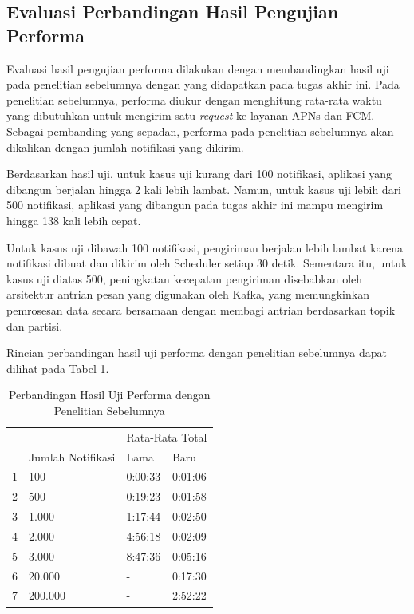 \subsection{Evaluasi Perbandingan Hasil Pengujian Performa}
\par Evaluasi hasil pengujian performa dilakukan dengan membandingkan hasil uji pada penelitian sebelumnya dengan yang didapatkan pada tugas akhir ini. Pada penelitian sebelumnya, performa diukur dengan menghitung rata-rata waktu yang dibutuhkan untuk mengirim satu \textit{request} ke layanan APNs dan FCM. Sebagai pembanding yang sepadan, performa pada penelitian sebelumnya akan dikalikan dengan jumlah notifikasi yang dikirim.
\par Berdasarkan hasil uji, untuk kasus uji kurang dari 100 notifikasi, aplikasi yang dibangun berjalan hingga 2 kali lebih lambat. Namun, untuk kasus uji lebih dari 500 notifikasi, aplikasi yang dibangun pada tugas akhir ini mampu mengirim hingga 138 kali lebih cepat.
\par Untuk kasus uji dibawah 100 notifikasi, pengiriman berjalan lebih lambat karena notifikasi dibuat dan dikirim oleh Scheduler setiap 30 detik. Sementara itu, untuk kasus uji diatas 500, peningkatan kecepatan pengiriman disebabkan oleh arsitektur antrian pesan yang digunakan oleh Kafka, yang memungkinkan pemrosesan data secara bersamaan dengan membagi antrian berdasarkan topik dan partisi.
\par Rincian perbandingan hasil uji performa dengan penelitian sebelumnya dapat dilihat pada Tabel \ref{t:perbandingan-performa}.
\begin{longtable}{|p{0.5cm}|p{3cm}|p{2.5cm}|p{2.5cm}|}
	\caption{Perbandingan Hasil Uji Performa dengan Penelitian Sebelumnya} \label{t:perbandingan-performa} \\ \hline
	\rowcolor{lightgray} & & \multicolumn{2}{c|}{Rata-Rata Total} \\ \hhline{~~|*2{-}|}
	\rowcolor{lightgray} \multirow{-2}{*}{No} & \multirow{-2}{*}{Jumlah Notifikasi} & Lama & Baru \\ \hline
	\endhead
	1 & 100 & 0:00:33 & 0:01:06 \\ \hline
	2 & 500 & 0:19:23 & 0:01:58 \\ \hline
	3 & 1.000 & 1:17:44 & 0:02:50 \\ \hline
	4 & 2.000 & 4:56:18 & 0:02:09 \\ \hline
	5 & 3.000 & 8:47:36 & 0:05:16 \\ \hline
	6 & 20.000 & - & 0:17:30 \\ \hline
	7 & 200.000 & - & 2:52:22 \\ \hline
\end{longtable}

